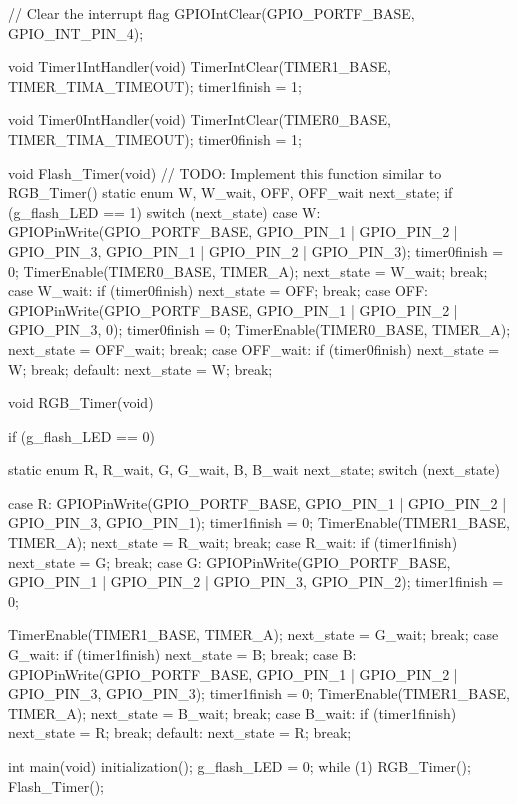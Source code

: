 \documentclass[12pt, a4paper]{article}
\begin{document}
\begin{code}
{{    }
    // Clear the interrupt flag
    GPIOIntClear(GPIO_PORTF_BASE, GPIO_INT_PIN_4);
}

void Timer1IntHandler(void)
{
    TimerIntClear(TIMER1_BASE, TIMER_TIMA_TIMEOUT);
    timer1finish = 1;
}

void Timer0IntHandler(void)
{
    TimerIntClear(TIMER0_BASE, TIMER_TIMA_TIMEOUT);
    timer0finish = 1;
}

void Flash_Timer(void)
{
    // TODO: Implement this function similar to RGB_Timer()
    static enum {W, W_wait, OFF, OFF_wait} next_state;
    if (g_flash_LED == 1) {
        switch (next_state) {
            case W:
                GPIOPinWrite(GPIO_PORTF_BASE, GPIO_PIN_1 | GPIO_PIN_2 | GPIO_PIN_3, GPIO_PIN_1 | GPIO_PIN_2 | GPIO_PIN_3);
                timer0finish = 0;
                TimerEnable(TIMER0_BASE, TIMER_A);
                next_state = W_wait;
                break;
            case W_wait:
                if (timer0finish)
                    next_state = OFF;
                break;
            case OFF:
                GPIOPinWrite(GPIO_PORTF_BASE, GPIO_PIN_1 | GPIO_PIN_2 | GPIO_PIN_3, 0);
                timer0finish = 0;
                TimerEnable(TIMER0_BASE, TIMER_A);
                next_state = OFF_wait;
                break;
            case OFF_wait:
                if (timer0finish)
                    next_state = W;
                break;
            default:
                next_state = W;
                break;
        }
    }
}

void RGB_Timer(void)
{
    if (g_flash_LED == 0)
    {
        static enum { R,
                      R_wait,
                      G,
                      G_wait,
                      B,
                      B_wait } next_state;
        switch (next_state)
        {
        case R:
            GPIOPinWrite(GPIO_PORTF_BASE, GPIO_PIN_1 | GPIO_PIN_2 | GPIO_PIN_3, GPIO_PIN_1);
            timer1finish = 0;
            TimerEnable(TIMER1_BASE, TIMER_A);
            next_state = R_wait;
            break;
        case R_wait:
            if (timer1finish)
                next_state = G;
            break;
        case G:
            GPIOPinWrite(GPIO_PORTF_BASE, GPIO_PIN_1 | GPIO_PIN_2 | GPIO_PIN_3, GPIO_PIN_2);
            timer1finish = 0;

            TimerEnable(TIMER1_BASE, TIMER_A);
            next_state = G_wait;
            break;
        case G_wait:
            if (timer1finish)
                next_state = B;
            break;
        case B:
            GPIOPinWrite(GPIO_PORTF_BASE, GPIO_PIN_1 | GPIO_PIN_2 | GPIO_PIN_3, GPIO_PIN_3);
            timer1finish = 0;
            TimerEnable(TIMER1_BASE, TIMER_A);
            next_state = B_wait;
            break;
        case B_wait:
            if (timer1finish)
                next_state = R;
            break;
        default:
            next_state = R;
            break;
        }
    }
}

int main(void)
{
    initialization();
    g_flash_LED = 0;
    while (1)
    {
        RGB_Timer();
        Flash_Timer();
    }
}
\end{code}
\end{document}
